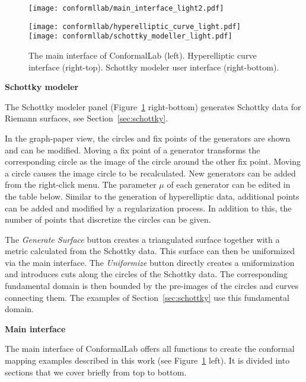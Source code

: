 \documentclass[Thesis.tex]{subfiles}
\begin{document}
\begin{figure}
\centering
\texttt{[image: conformllab/main\_interface\_light2.pdf]}\hfill
\begin{minipage}[b]{0.5\linewidth}
\texttt{[image: conformllab/hyperelliptic\_curve\_light.pdf]}
\vspace{1mm}\\
\texttt{[image: conformllab/schottky\_modeller\_light.pdf]}
\end{minipage}
\caption{The main interface of {\sc ConformalLab} (left). Hyperelliptic curve interface (right-top).
Schottky modeler user interface (right-bottom).}
\label{fig:conformal_main_generators}
\end{figure}

{\bf Schottky modeler}

The Schottky modeler panel (Figure~\ref{fig:conformal_main_generators} right-bottom) generates Schottky data for Riemann surfaces, see Section~\ref{sec:schottky}. 

In the graph-paper view, the circles and fix points of the generators are shown and can be modified. 
Moving a fix point of a generator transforms the corresponding circle as the image of the circle around the other fix point. 
Moving a circle causes the image circle to be recalculated. 
New generators can be added from the right-click menu. 
The parameter $\mu$ of each generator can be edited in the table below.
Similar to the generation of hyperelliptic data, additional points can be added and modified by a regularization process. 
In addition to this, the number of points that discretize the circles can be given.

The \emph{Generate Surface} button creates a triangulated surface together with a metric calculated from the Schottky data. 
This surface can then be uniformized via the main interface. 
The \emph{Uniformize} button directly creates a uniformization and introduces cuts along the circles of the Schottky data. 
The corresponding fundamental domain is then bounded by the pre-images of the circles and curves connecting them.
The examples of Section~\ref{sec:schottky} use this fundamental domain.

{\bf Main interface}

The main interface of {\sc ConformalLab} offers all functions to create the conformal mapping examples described in this work (see Figure~\ref{fig:conformal_main_generators} left). 
It is divided into sections that we cover briefly from top to bottom. 
\end{document}
